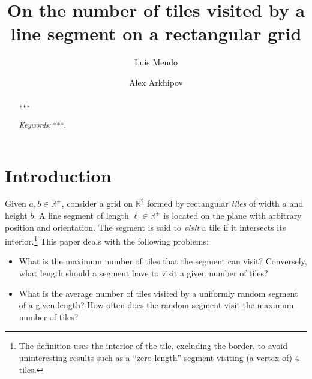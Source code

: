 \documentclass[12pt, a4paper]{article}
\newcommand{\len}{\ell} %
\begin{document}
\title{
On the number of tiles visited by a\\
line segment on a rectangular grid
}

\author[1]{Luis Mendo}
\author[2]{Alex Arkhipov}




\maketitle

\begin{abstract}
***

\emph{Keywords:} ***.

\end{abstract}


\section{Introduction}
\label{part: intro}

Given $a, b \in \mathbb R^+$, consider a grid on $\mathbb R^2$ formed by rectangular \emph{tiles} of width $a$ and height $b$. A line segment of length $\len \in \mathbb R^+$ is located on the plane with arbitrary position and orientation. The segment is said to \emph{visit} a tile if it intersects its interior.\footnote{
The definition uses the interior of the tile, excluding the border, to avoid uninteresting results such as a ``zero-length'' segment visiting (a vertex of) $4$ tiles.} This paper deals with the following problems:
\begin{itemize}
\item What is the maximum number of tiles that the segment can visit? Conversely, what length should a segment have to visit a given number of tiles?
\item What is the average number of tiles visited by a uniformly random segment of a given length? How often does the random segment visit the maximum number of tiles?
\end{itemize}
\end{document}
